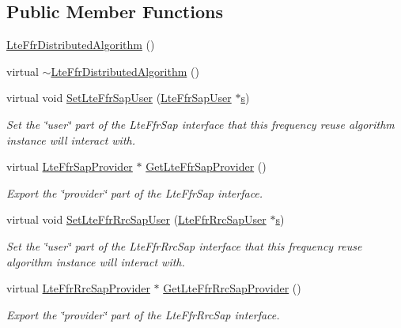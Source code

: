 \subsection*{Public Member Functions}
\begin{DoxyCompactItemize}
\item 
\hyperlink{classns3_1_1LteFfrDistributedAlgorithm_a5fd18eae96198331091bbb7b0391f4fa}{Lte\+Ffr\+Distributed\+Algorithm} ()
\item 
virtual \hyperlink{classns3_1_1LteFfrDistributedAlgorithm_a250c00c534cdb6ab1ba311f79f164c84}{$\sim$\+Lte\+Ffr\+Distributed\+Algorithm} ()
\item 
virtual void \hyperlink{classns3_1_1LteFfrDistributedAlgorithm_ad0c5f68ab9d3f08e313ffc59ebbc3356}{Set\+Lte\+Ffr\+Sap\+User} (\hyperlink{classns3_1_1LteFfrSapUser}{Lte\+Ffr\+Sap\+User} $\ast$\hyperlink{generate__test__data__lte__sinr_8m_ad83eeb3a142285d1243a08c6b7026df8}{s})
\begin{DoxyCompactList}\small\item\em Set the \char`\"{}user\char`\"{} part of the Lte\+Ffr\+Sap interface that this frequency reuse algorithm instance will interact with. \end{DoxyCompactList}\item 
virtual \hyperlink{classns3_1_1LteFfrSapProvider}{Lte\+Ffr\+Sap\+Provider} $\ast$ \hyperlink{classns3_1_1LteFfrDistributedAlgorithm_a457d4b7d7764d6bb3d9109bf7232df5d}{Get\+Lte\+Ffr\+Sap\+Provider} ()
\begin{DoxyCompactList}\small\item\em Export the \char`\"{}provider\char`\"{} part of the Lte\+Ffr\+Sap interface. \end{DoxyCompactList}\item 
virtual void \hyperlink{classns3_1_1LteFfrDistributedAlgorithm_a26672ab709ff8132bc0b5f2c1434e1dc}{Set\+Lte\+Ffr\+Rrc\+Sap\+User} (\hyperlink{classns3_1_1LteFfrRrcSapUser}{Lte\+Ffr\+Rrc\+Sap\+User} $\ast$\hyperlink{generate__test__data__lte__sinr_8m_ad83eeb3a142285d1243a08c6b7026df8}{s})
\begin{DoxyCompactList}\small\item\em Set the \char`\"{}user\char`\"{} part of the Lte\+Ffr\+Rrc\+Sap interface that this frequency reuse algorithm instance will interact with. \end{DoxyCompactList}\item 
virtual \hyperlink{classns3_1_1LteFfrRrcSapProvider}{Lte\+Ffr\+Rrc\+Sap\+Provider} $\ast$ \hyperlink{classns3_1_1LteFfrDistributedAlgorithm_a0b5715c73c575b204aadb9836507a872}{Get\+Lte\+Ffr\+Rrc\+Sap\+Provider} ()
\begin{DoxyCompactList}\small\item\em Export the \char`\"{}provider\char`\"{} part of the Lte\+Ffr\+Rrc\+Sap interface. \end{DoxyCompactList}\end{DoxyCompactItemize}
